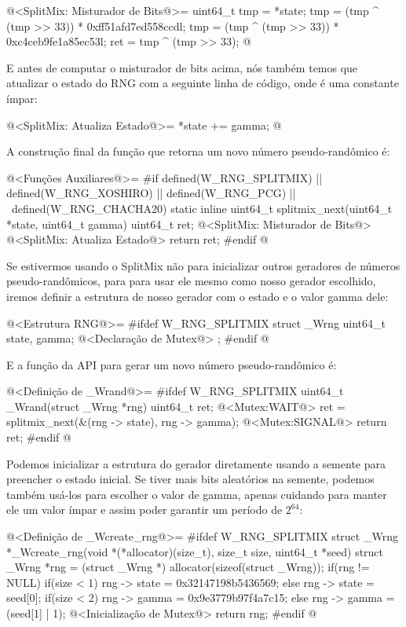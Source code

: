 \iniciocodigo
@<SplitMix: Misturador de Bits@>=
{
  uint64_t tmp = *state;
  tmp = (tmp ^ (tmp >> 33)) * 0xff51afd7ed558ccdl;
  tmp = (tmp ^ (tmp >> 33)) * 0xc4ceb9fe1a85ec53l;
  ret = tmp ^ (tmp >> 33);
} 
@
\fimcodigo

E antes de computar o misturador de bits acima, nós também temos que
atualizar o estado do RNG com a seguinte linha de código,
onde  é uma constante ímpar:

\iniciocodigo
@<SplitMix: Atualiza Estado@>=
{
  *state +=  gamma;
} 
@
\fimcodigo

A construção final da função que retorna um novo número
pseudo-randômico é:

\iniciocodigo
@<Funções Auxiliares@>=
#if defined(W_RNG_SPLITMIX) || defined(W_RNG_XOSHIRO) || defined(W_RNG_PCG) || \
  defined(W_RNG_CHACHA20)
static inline uint64_t splitmix_next(uint64_t *state, uint64_t gamma){
  uint64_t ret;
  @<SplitMix: Misturador de Bits@>
  @<SplitMix: Atualiza Estado@>
  return ret;
}
#endif
@
\fimcodigo

Se estivermos usando o SplitMix não para inicializar outros geradores
de números pseudo-randômicos, para para usar ele mesmo como nosso
gerador escolhido, iremos definir a estrutura de nosso gerador com o
estado e o valor gamma dele:

\iniciocodigo
@<Estrutura RNG@>=
#ifdef W_RNG_SPLITMIX
struct _Wrng{
  uint64_t state, gamma;
  @<Declaração de Mutex@>
};
#endif
@
\fimcodigo

E a função da API para gerar um novo número pseudo-randômico é:

\iniciocodigo
@<Definição de \_Wrand@>=
#ifdef W_RNG_SPLITMIX
uint64_t _Wrand(struct _Wrng *rng){
  uint64_t ret;
  @<Mutex:WAIT@>
  ret = splitmix_next(&(rng -> state), rng -> gamma);
  @<Mutex:SIGNAL@>
  return ret;
}
#endif
@
\fimcodigo

Podemos inicializar a estrutura do gerador diretamente usando a
semente para preencher o estado inicial. Se tiver mais bits aleatórios
na semente, podemos também usá-los para escolher o valor de gamma,
apenas cuidando para manter ele um valor ímpar e assim poder garantir
um período de $2^{64}$:

\iniciocodigo
@<Definição de \_Wcreate\_rng@>=
#ifdef W_RNG_SPLITMIX
struct _Wrng *_Wcreate_rng(void *(*allocator)(size_t), size_t size,
                           uint64_t *seed){
  struct _Wrng *rng = (struct _Wrng *) allocator(sizeof(struct _Wrng));
  if(rng != NULL){
    if(size < 1)
      rng -> state = 0x32147198b5436569;
    else
      rng -> state = seed[0];
    if(size < 2)
      rng -> gamma = 0x9e3779b97f4a7c15;
    else
      rng -> gamma = (seed[1] | 1);
    @<Inicialização de Mutex@>
  }
  return rng;
}
#endif
@
\fimcodigo


